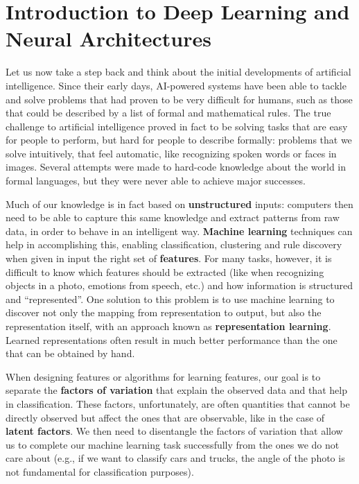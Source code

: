 \chapter{Introduction to Deep Learning and Neural Architectures}
Let us now take a step back and think about the initial developments of artificial intelligence. Since their early days, AI-powered systems have been able to tackle and solve problems that had proven to be very difficult for humans, such as those that could be described by a list of formal and mathematical rules. The true challenge to artificial intelligence proved in fact to be solving tasks that are easy for people to perform, but hard for people to describe formally: problems that we solve intuitively, that feel automatic, like recognizing spoken words or faces in images. Several attempts were made to hard-code knowledge about the world in formal languages, but they were never able to achieve major successes.

Much of our knowledge is in fact based on \textbf{unstructured} inputs: computers then need to be able to capture this same knowledge and extract patterns from raw data, in order to behave in an intelligent way. \textbf{Machine learning} techniques can help in accomplishing this, enabling classification, clustering and rule discovery when given in input the right set of \textbf{features}. For many tasks, however, it is difficult to know which features should be extracted (like when recognizing objects in a photo, emotions from speech, etc.) and how information is structured and ``represented''. One solution to this problem is to use machine learning to discover not only the mapping from representation to output, but also the representation itself, with an approach known as \textbf{representation learning}. Learned representations often result in much better performance than the one that can be obtained by hand.

When designing features or algorithms for learning features, our goal is to separate the \textbf{factors of variation} that explain the observed data and that help in classification. These factors, unfortunately, are often quantities that cannot be directly observed but affect the ones that are observable, like in the case of \textbf{latent factors}. We then need to disentangle the factors of variation that allow us to complete our machine learning task successfully from the ones we do not care about (e.g., if we want to classify cars and trucks, the angle of the photo is not fundamental for classification purposes).

